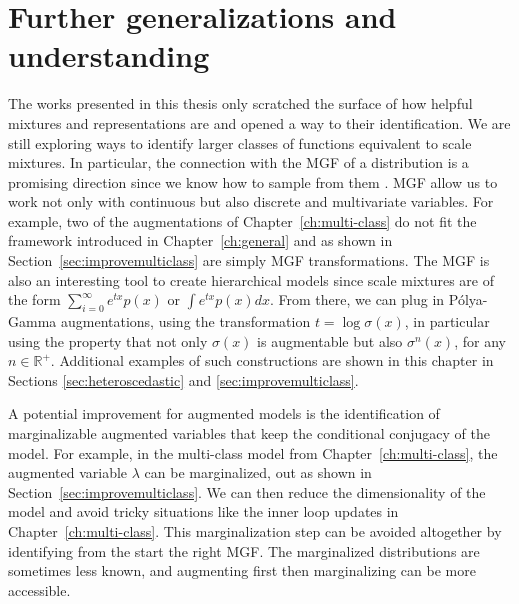 

\graphicspath{{8/figures/}}


\section{Further generalizations and understanding}
The works presented in this thesis only scratched the surface of how helpful mixtures and representations are and opened a way to their identification.
We are still exploring ways to identify larger classes of functions equivalent  to scale mixtures.
In particular, the connection with the \acf{MGF} of a distribution is a promising direction since we know how to sample from them \cite{ridout2009generating}.
\ac{MGF} allow us to work not only with continuous but also discrete and multivariate variables.
For example, two of the augmentations of Chapter~\ref{ch:multi-class} do not fit the framework introduced in Chapter~\ref{ch:general} and as shown in Section~\ref{sec:improvemulticlass} are simply \ac{MGF} transformations.
The \ac{MGF} is also an interesting tool to create hierarchical models since scale mixtures are of the form $\sum_{i=0}^\infty e^{tx} p(x)$ or $\int e^{tx}p(x)dx$.
From there, we can plug in P\'olya-Gamma augmentations, using the transformation $t=\log \sigma(x)$, in particular using the property that not only $\sigma(x)$ is augmentable but also $\sigma^n(x)$, for any $n\in \mathbb{R}^+$.
Additional examples of such constructions are shown in this chapter in Sections \ref{sec:heteroscedastic} and \ref{sec:improvemulticlass}.

A potential improvement for augmented models is the identification of marginalizable augmented variables that keep the conditional conjugacy of the model.
For example, in the multi-class model from Chapter~\ref{ch:multi-class}, the augmented variable $\lambda$ can be marginalized, out as shown in Section~\ref{sec:improvemulticlass}.
We can then reduce the dimensionality of the model and avoid tricky situations like the inner loop updates in Chapter~\ref{ch:multi-class}.
This marginalization step can be avoided altogether by identifying from the start the right \ac{MGF}. The marginalized distributions are sometimes less known, and augmenting first then marginalizing can be more accessible.

